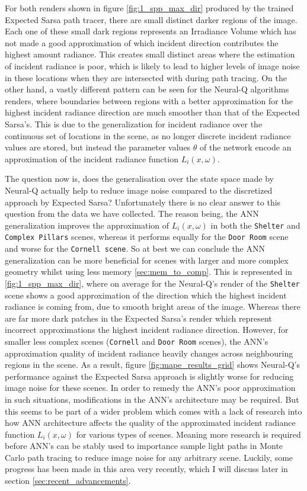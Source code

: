 \documentclass[../dissertation.tex]{subfiles}
\begin{document}
For both renders shown in figure \ref{fig:1_spp_max_dir} produced by the trained Expected Sarsa path tracer, there are small distinct darker regions of the image. Each one of these small dark regions represents an Irradiance Volume which has not made a good approximation of which incident direction contributes the highest amount radiance. This creates small distinct areas where the estimation of incident radiance is poor, which is likely to lead to higher levels of image noise in these locations when they are intersected with during path tracing. On the other hand, a vastly different pattern can be seen for the Neural-Q algorithms renders, where boundaries between regions with a better approximation for the highest incident radiance direction are much smoother than that of the Expected Sarsa's. This is due to the generalization for incident radiance over the continuous set of locations in the scene, as no longer discrete incident radiance values are stored, but instead the parameter values $\theta$ of the network encode an approximation of the incident radiance function $L_i(x, \omega)$.

The question now is, does the generalisation over the state space made by Neural-Q actually help to reduce image noise compared to the discretized approach by Expected Sarsa? Unfortunately there is no clear answer to this question from the data we have collected. The reason being, the ANN generalization improves the approximation of $L_i(x, \omega)$ in both the \verb|Shelter| and \verb|Complex Pillars| scenes, whereas it performs equally for the \verb|Door Room| scene and worse for the \verb|Cornell scene|. So at best we can conclude the ANN generalization can be more  beneficial for scenes with larger and more complex geometry whilst using less memory \ref{sec:mem_to_comp}. This is represented in \ref{fig:1_spp_max_dir}, where on average for the Neural-Q's render of the \verb|Shelter| scene shows a good approximation of the direction which the highest incident radiance is coming from, due to smooth bright areas of the image. Whereas there are far more dark patches  in the Expected Sarsa's render which represent incorrect approximations the highest incident radiance direction. However, for smaller less complex scenes (\verb|Cornell| and \verb|Door Room| scenes), the ANN's approximation quality of incident radiance heavily changes across neighbouring regions in the scene. As a result, figure \ref{fig:mape_results_grid} shows Neural-Q's performance against the Expected Sarsa approach is slightly worse for reducing image noise for these scenes. In order to remedy the ANN's poor approximation in such situations, modifications in the ANN's architecture may be required. But this seems to be part of a wider problem which comes with a lack of research into how ANN architecture affects the quality of the approximated incident radiance function $L_i(x, \omega)$ for various types of scenes. Meaning more research is required before ANN's can be stably used to importance sample light paths in Monte Carlo path tracing to reduce image noise for any arbitrary scene. Luckily, some progress has been made in this area very recently, which I will discuss later in section \ref{sec:recent_advancements}.
\end{document}
